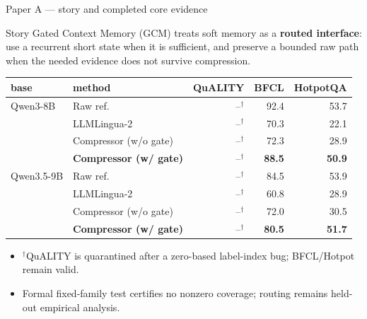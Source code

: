 \begin{frame}{Paper A --- story and completed core evidence}
  \small
  \begin{block}{Story}
    Gated Context Memory (GCM) treats soft memory as a \textbf{routed interface}: use a recurrent
    short state when it is sufficient, and preserve a bounded raw path when the needed evidence does not
    survive compression.
  \end{block}
  \centering\scriptsize
  \begin{tabular}{llrrr}
  \toprule
  base & method & QuALITY & BFCL & HotpotQA \\
  \midrule
  Qwen3-8B & Raw ref. & --$^\dagger$ & 92.4 & 53.7 \\
            & LLMLingua-2 & --$^\dagger$ & 70.3 & 22.1 \\
            & Compressor (w/o gate) & --$^\dagger$ & 72.3 & 28.9 \\
            & \textbf{Compressor (w/ gate)} & --$^\dagger$ & \textbf{88.5} & \textbf{50.9} \\
  Qwen3.5-9B & Raw ref. & --$^\dagger$ & 84.5 & 53.9 \\
              & LLMLingua-2 & --$^\dagger$ & 60.8 & 28.9 \\
              & Compressor (w/o gate) & --$^\dagger$ & 72.0 & 30.5 \\
              & \textbf{Compressor (w/ gate)} & --$^\dagger$ & \textbf{80.5} & \textbf{51.7} \\
  \bottomrule
  \end{tabular}
  \vspace{0.35em}
  \begin{itemize}\footnotesize
    \item $^\dagger$QuALITY is quarantined after a zero-based label-index bug; BFCL/Hotpot remain valid.
    \item Formal fixed-family test certifies no nonzero coverage; routing remains held-out empirical analysis.
  \end{itemize}
\end{frame}

